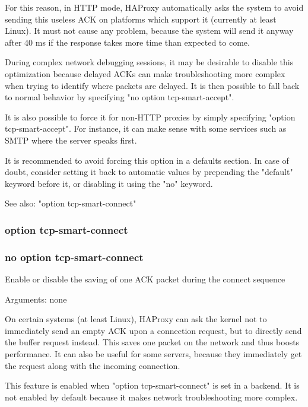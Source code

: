   For this reason, in HTTP mode, HAProxy automatically asks the system to avoid
  sending this useless ACK on platforms which support it (currently at least
  Linux). It must not cause any problem, because the system will send it anyway
  after 40 ms if the response takes more time than expected to come.

  During complex network debugging sessions, it may be desirable to disable
  this optimization because delayed ACKs can make troubleshooting more complex
  when trying to identify where packets are delayed. It is then possible to
  fall back to normal behavior by specifying "no option tcp-smart-accept".

  It is also possible to force it for non-HTTP proxies by simply specifying
  "option tcp-smart-accept". For instance, it can make sense with some services
  such as SMTP where the server speaks first.

  It is recommended to avoid forcing this option in a defaults section. In case
  of doubt, consider setting it back to automatic values by prepending the
  "default" keyword before it, or disabling it using the "no" keyword.

  See also: "option tcp-smart-connect"

\subsubsection{option tcp-smart-connect}
\subsubsection{no option tcp-smart-connect}


  Enable or disable the saving of one ACK packet during the connect sequence


  Arguments: none

  On certain systems (at least Linux), HAProxy can ask the kernel not to
  immediately send an empty ACK upon a connection request, but to directly
  send the buffer request instead. This saves one packet on the network and
  thus boosts performance. It can also be useful for some servers, because they
  immediately get the request along with the incoming connection.

  This feature is enabled when "option tcp-smart-connect" is set in a backend.
  It is not enabled by default because it makes network troubleshooting more
  complex.

